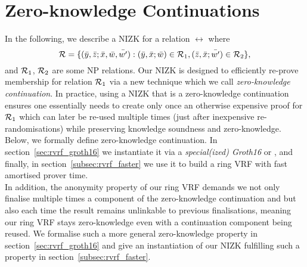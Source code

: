 \section{Zero-knowledge Continuations}
\label{sec:rvrf_cont}

\noindent In the following, we describe a NIZK for a relation $\rel$ where
$$\mathcal{R} = \{(\bar{y}, \bar{z}; \bar{x}, \bar{w}, \bar{w'}):  (\bar{y}, \bar{x}; \bar{w}) \in \mathcal{R}_1, (\bar{z}, \bar{x}; \bar{w'}) \in \mathcal{R}_2 \},$$
and $\mathcal{R}_1$, $\mathcal{R}_2$ are some NP relations. Our NIZK is designed to efficiently re-prove membership for relation $\mathcal{R}_1$
via a new technique which we call \emph{zero-knowledge continuation}. In practice, using a NIZK that is a zero-knowledge continuation 
ensures one essentially needs to create only once an otherwise expensive proof for $\mathcal{R}_1$ which can later be 
re-used multiple times (just after inexpensive re-randomisations) while preserving knowledge soundness and zero-knowledge. 
Below, we formally define zero-knowledge continuation. In section~\ref{sec:rvrf_groth16} we instantiate it via a \emph{special(ized) 
Groth16} or \specg, and finally, in section~\ref{subsec:rvrf_faster} we use it to build a ring VRF with fast amortised prover time. \\

\noindent In addition, the anonymity property of our ring VRF demands we not only finalise multiple times a component of the zero-knowledge 
continuation and but also each time the result remains unlinkable to previous finalisations, meaning our ring VRF stays zero-knowledge 
even with a continuation component being reused. We formalise such a more general zero-knowledge property in 
section~\ref{sec:rvrf_groth16} and give an instantiation of our NIZK fulfilling such a property in section~\ref{subsec:rvrf_faster}. 



